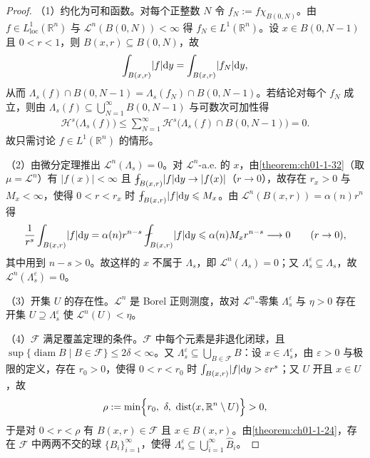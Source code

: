 \documentclass[../../main.tex]{subfiles}%
\begin{document}
\begin{proof}
（1）约化为可和函数。对每个正整数 $N$ 令 $f_N:=f\chi_{B(0,N)}$。由 $f\in L^1_{\mathrm{loc}}(\mathbb{R}^n)$ 与 $\mathcal{L}^n(B(0,N))<\infty$ 得 $f_N\in L^1(\mathbb{R}^n)$。设 $x\in B(0,N-1)$ 且 $0<r<1$，则 $B(x,r)\subseteq B(0,N)$，故
\begin{align*}
\int_{B(x,r)}\lvert f\rvert\mathrm{d} y=\int_{B(x,r)}\lvert f_N\rvert\mathrm{d} y ,
\end{align*}
从而 $\Lambda_s(f)\cap B(0,N-1)=\Lambda_s(f_N)\cap B(0,N-1)$。若结论对每个 $f_N$ 成立，则由 $\Lambda_s(f)\subseteq\bigcup_{N=1}^{\infty}B(0,N-1)$ 与可数次可加性得
\begin{align*}
\mathcal{H}^s\bigl(\Lambda_s(f)\bigr)\leqslant\sum_{N=1}^{\infty}\mathcal{H}^s\bigl(\Lambda_s(f)\cap B(0,N-1)\bigr)=0 .
\end{align*}
故只需讨论 $f\in L^1(\mathbb{R}^n)$ 的情形。

（2）由微分定理推出 $\mathcal{L}^n(\Lambda_s)=0$。对 $\mathcal{L}^n$-a.e. 的 $x$，由\cref{theorem:ch01-1-32}（取 $\mu=\mathcal{L}^n$）有 $\lvert f(x)\rvert<\infty$ 且 $\fint_{B(x,r)}\lvert f\rvert\diff y\to\lvert f(x)\rvert$（$r\to0$），故存在 $r_x>0$ 与 $M_x<\infty$，使得 $0<r<r_x$ 时 $\fint_{B(x,r)}\lvert f\rvert\diff y\leqslant M_x$。由 $\mathcal{L}^n(B(x,r))=\alpha(n)r^n$ 得%
\begin{align*}
\frac{1}{r^s}\int_{B(x,r)}\lvert f\rvert\diff y
=\alpha(n)r^{n-s}\fint_{B(x,r)}\lvert f\rvert\diff y
\leqslant\alpha(n)M_xr^{n-s}\longrightarrow0\qquad(r\to0),
\end{align*}
其中用到 $n-s>0$。故这样的 $x$ 不属于 $\Lambda_s$，即 $\mathcal{L}^n(\Lambda_s)=0$；又 $\Lambda_s^\varepsilon\subseteq\Lambda_s$，故 $\mathcal{L}^n(\Lambda_s^\varepsilon)=0$。

（3）开集 $U$ 的存在性。$\mathcal{L}^n$ 是 Borel 正则测度，故对 $\mathcal{L}^n$-零集 $\Lambda_s^\varepsilon$ 与 $\eta>0$ 存在开集 $U\supseteq\Lambda_s^\varepsilon$ 使 $\mathcal{L}^n(U)<\eta$。

（4）$\mathcal{F}$ 满足覆盖定理的条件。$\mathcal{F}$ 中每个元素是非退化闭球，且 $\sup\{\operatorname{diam}B\mid B\in\mathcal{F}\}\leqslant2\delta<\infty$。又 $\Lambda_s^\varepsilon\subseteq\bigcup_{B\in\mathcal{F}}B$：设 $x\in\Lambda_s^\varepsilon$，由 $\varepsilon>0$ 与极限的定义，存在 $r_0>0$，使得 $0<r<r_0$ 时 $\int_{B(x,r)}\lvert f\rvert\mathrm{d} y>\varepsilon r^s$；又 $U$ 开且 $x\in U$，故
\begin{align*}
\rho:=\min\Bigl\{r_0,\ \delta,\ \operatorname{dist}(x,\mathbb{R}^n\setminus U)\Bigr\}>0 ,
\end{align*}
于是对 $0<r<\rho$ 有 $B(x,r)\in\mathcal{F}$ 且 $x\in B(x,r)$。由\cref{theorem:ch01-1-24}，存在 $\mathcal{F}$ 中两两不交的球 $\{B_i\}_{i=1}^{\infty}$，使得 $\Lambda_s^\varepsilon\subseteq\bigcup_{i=1}^{\infty}\hat B_i$。%


\end{proof}
\end{document}
